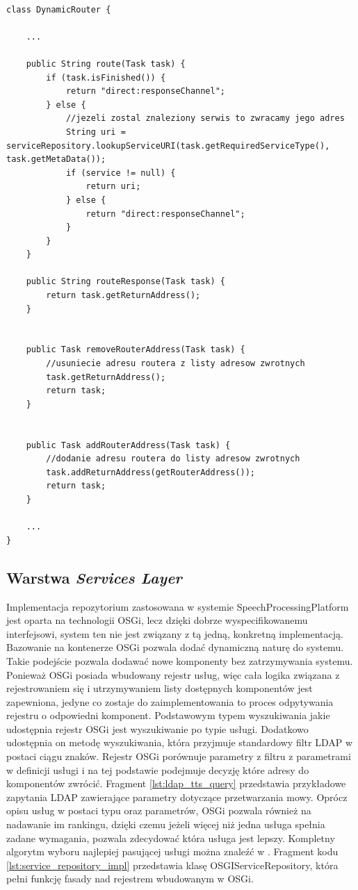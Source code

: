 \lstset{language=Java, tabsize=4, caption=Implementacja metody routującej wiadomości do odpowiednich komponentów przetwarzania mowy.,label=lst:router_impl}

\begin{center}
\begin{lstlisting}

class DynamicRouter {

	...

	public String route(Task task) {
		if (task.isFinished()) {
			return "direct:responseChannel";
		} else {
			//jezeli zostal znaleziony serwis to zwracamy jego adres
			String uri = serviceRepository.lookupServiceURI(task.getRequiredServiceType(), task.getMetaData());
			if (service != null) {
				return uri;
			} else {
				return "direct:responseChannel";
			}
		}
	}

	public String routeResponse(Task task) {
		return task.getReturnAddress();
	}


	public Task removeRouterAddress(Task task) {
		//usuniecie adresu routera z listy adresow zwrotnych
		task.getReturnAddress();
		return task;
	}


	public Task addRouterAddress(Task task) {
		//dodanie adresu routera do listy adresow zwrotnych
		task.addReturnAddress(getRouterAddress());
		return task;
	}

	...
}
\end{lstlisting}
\end{center}

\subsection{Warstwa \textit{Services Layer}}

Implementacja repozytorium zastosowana w systemie SpeechProcessingPlatform jest oparta na technologii OSGi, lecz dzięki dobrze wyspecifikowanemu interfejsowi, system ten nie jest związany z tą jedną, konkretną implementacją. Bazowanie na kontenerze OSGi pozwala dodać dynamiczną naturę do systemu. Takie podejście pozwala dodawać nowe komponenty bez zatrzymywania systemu. Ponieważ OSGi posiada wbudowany rejestr usług, więc cała logika związana z rejestrowaniem się i utrzymywaniem listy dostępnych komponentów jest zapewniona, jedyne co zostaje do zaimplementowania to proces odpytywania rejestru o odpowiedni komponent. Podstawowym typem wyszukiwania jakie udostępnia rejestr OSGi jest wyszukiwanie po typie usługi. Dodatkowo udostępnia on metodę wyszukiwania, która przyjmuje standardowy filtr LDAP \cite{ldaprfc1996} w postaci ciągu znaków. Rejestr OSGi porównuje parametry z filtru z parametrami w definicji usługi i na tej podstawie podejmuje decyzję które adresy do komponentów zwrócić. Fragment \ref{lst:ldap_tts_query} przedstawia przykładowe zapytania LDAP zawierające parametry dotyczące przetwarzania mowy. Oprócz opisu usług w postaci typu oraz parametrów, OSGi pozwala również na nadawanie im rankingu, dzięki czemu jeżeli więcej niż jedna usługa spełnia zadane wymagania, pozwala zdecydować która usługa jest lepszy. Kompletny algorytm wyboru najlepiej pasującej usługi można znaleźć w \cite{hall2011}. Fragment kodu \ref{lst:service_repository_impl} przedstawia klasę OSGIServiceRepository, która pełni funkcję fasady nad rejestrem wbudowanym w OSGi.

